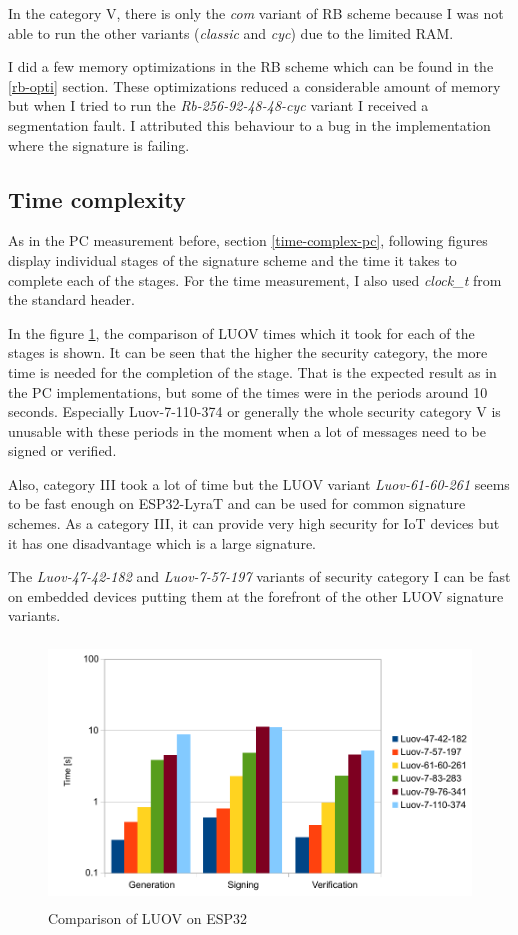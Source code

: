 \documentclass[thesis=M,english]{FITthesis}[2019/12/23]
\begin{document}
\noindent
In the category V, there is only the \textit{com} variant of RB scheme because I was not able to run the other variants (\textit{classic} and \textit{cyc}) due to the limited RAM. 

\bigskip
\noindent
I did a few memory optimizations in the RB scheme which can be found in the \ref{rb-opti} section. These optimizations reduced a considerable amount of memory but when I tried to run the \textit{Rb-256-92-48-48-cyc} variant I received a segmentation fault. I attributed this behaviour to a bug in the implementation where the signature is failing. 

\subsection{Time complexity}
As in the PC measurement before, section \ref{time-complex-pc}, following figures display individual stages of the signature scheme and the time it takes to complete each of the stages. For the time measurement, I also used \textit{clock\_t} from the standard header.

\bigskip
\noindent
In the figure \ref{time-luov}, the comparison of LUOV times which it took for each of the stages is shown. It can be seen that the higher the security category, the more time is needed for the completion of the stage. That is the expected result as in the PC implementations, but some of the times were in the periods around 10 seconds. Especially Luov-7-110-374 or generally the whole security category V is unusable with these periods in the moment when a lot of messages need to be signed or verified.

\bigskip
\noindent
Also, category III took a lot of time but the LUOV variant \textit{Luov-61-60-261} seems to be fast enough on ESP32-LyraT and can be used for common signature schemes. As a category III, it can provide very high security for IoT devices but it has one disadvantage which is a large signature. 

\bigskip
\noindent
The \textit{Luov-47-42-182} and \textit{Luov-7-57-197} variants of security category I can be fast on embedded devices putting  them at the forefront of the other LUOV signature variants. 

\bigskip
\begin{figure}[H]
\centering
\includegraphics[width=13cm,height=7cm]{images/time-luov.pdf}
\caption{Comparison of LUOV on ESP32}
\label{time-luov}
\end{figure}
\end{document}
